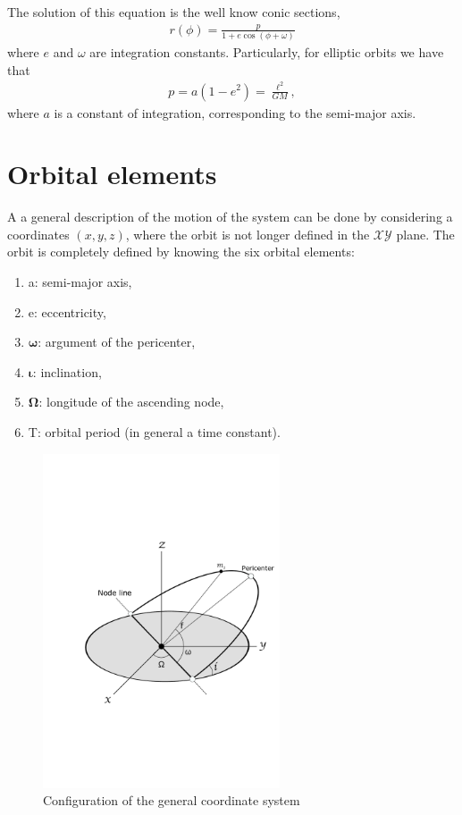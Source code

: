 The solution of this equation is the well know conic sections,
\begin{align}
r (\phi) = \frac{p}{1+e\cos(\phi+\omega)}
\end{align}
where $e$ and $\omega$ are integration constants. Particularly, for elliptic orbits we have that \begin{align}
p = a(1-e^2) = \frac{\ell^2}{GM},
\end{align}
where $a$ is a constant of integration, corresponding to the semi-major axis.

\section{Orbital elements}
A a general description of the motion of the system can be done by considering a coordinates $(x,y,z)$, where the orbit is not longer defined in the $\mathcal{X}\mathcal{Y}$ plane. The orbit is completely defined by knowing the six orbital elements:
\begin{enumerate}\bfseries
\color{forestgreen}
\item  a: semi-major axis,
\item e: eccentricity,
\item $\boldsymbol{\omega}$: argument of the pericenter,
\item $\boldsymbol{\iota}$: inclination,
\item $\boldsymbol{\Omega}$: longitude of the ascending node,
\item T: orbital period (in general a time constant).
\end{enumerate}

\begin{figure}[htb!]
\centering
\includegraphics[width=7cm]{../Tesis/Capitulo2/Figures/elementosorbitales.pdf}
\caption{Configuration of the general coordinate system}
\label{fig: orbitalelementsdibujo}
\end{figure}

